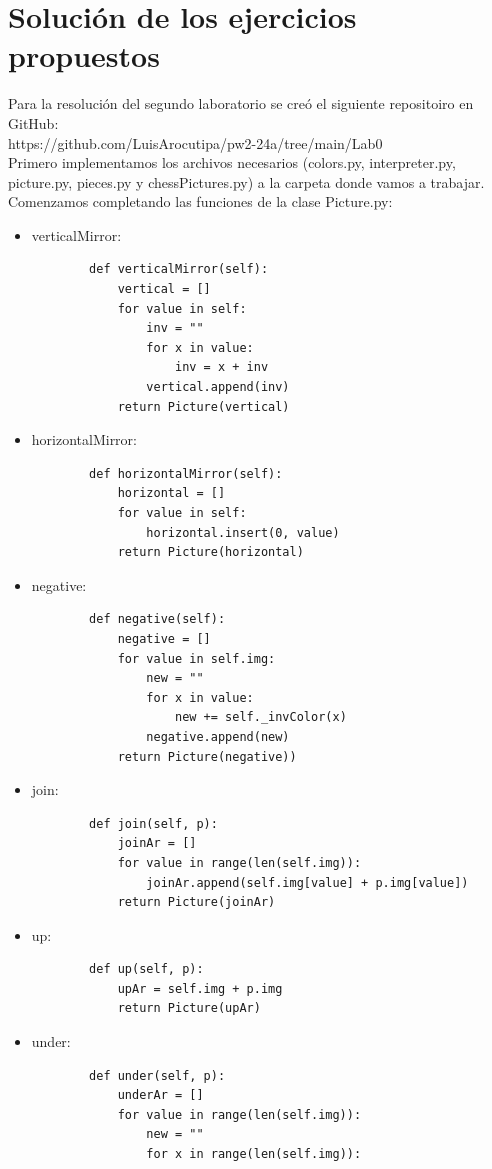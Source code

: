 \documentclass{article}
\begin{document}
	\section*{Solución de los ejercicios propuestos}
	Para la resolución del segundo laboratorio se creó el siguiente repositoiro en GitHub:\\    
	https://github.com/LuisArocutipa/pw2-24a/tree/main/Lab0 
	\\Primero implementamos los archivos necesarios (colors.py, interpreter.py, picture.py, pieces.py y chessPictures.py) a la carpeta donde vamos a trabajar.
	\\Comenzamos completando las funciones de la clase Picture.py:
	\begin{itemize}
		\item verticalMirror: 
		\begin{lstlisting}
		def verticalMirror(self):
			vertical = []
			for value in self:
				inv = ""
				for x in value:
					inv = x + inv
				vertical.append(inv)
			return Picture(vertical)
		\end{lstlisting}
		\item horizontalMirror:
		\begin{lstlisting}
		def horizontalMirror(self):
			horizontal = []
			for value in self:
				horizontal.insert(0, value)
			return Picture(horizontal)
		\end{lstlisting}
		\item negative:
		\begin{lstlisting}
		def negative(self):
			negative = []
			for value in self.img:
				new = ""
				for x in value:
					new += self._invColor(x)
				negative.append(new)
			return Picture(negative))
		\end{lstlisting}
		\item join:
		\begin{lstlisting}
		def join(self, p):
			joinAr = []
			for value in range(len(self.img)):
				joinAr.append(self.img[value] + p.img[value])
			return Picture(joinAr)
		\end{lstlisting}
		\item up:
		\begin{lstlisting}
		def up(self, p):
			upAr = self.img + p.img
			return Picture(upAr)
		\end{lstlisting}
		\item under:
		\begin{lstlisting}
		def under(self, p):
			underAr = []
			for value in range(len(self.img)):
				new = ""
				for x in range(len(self.img)):

\end{lstlisting}
\end{itemize}
\end{document}
